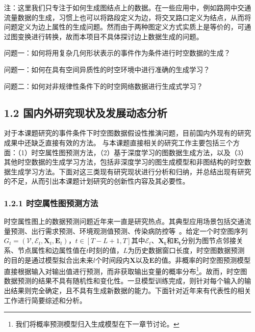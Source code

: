 \documentclass[12pt,UTF8,AutoFakeBold=2,a4paper]{ctexart} %
\begin{document}
注：这里我们只专注于如何生成图结点上的数据。在一些应用中，例如路网中交通流量数据的生成，习惯上也可以将路段定义为边，将交叉路口定义为结点，从而将问题定义为边上属性的生成问题。然而由于两种图定义方式实质上是等价的，可通过图变换进行转换，故而本项目不具体探讨边上数据生成的问题。



问题一：如何将用复杂几何形状表示的事件作为条件进行时空数据的生成？

问题一：如何在具有空间异质性的时空环境中进行准确的生成学习？

问题二：如何对非规律性条件下的时空网络数据进行生成式学习？

\fi

%
%

\subsection{1.2 国内外研究现状及发展动态分析}
对于本课题研究的事件条件下时空图数据假设性推演问题，目前国内外现有的研究成果中还缺乏直接有效的方法。 与本课题直接相关的研究工作主要包括三个方面：（1）时空属性图预测方法，（2）基于深度学习的图数据生成方法，以及（3）其他时空数据的生成学习方法，包括非深度学习的图生成模型和非图结构的时空数据生成学习方法。下面对这三类现有研究现状进行分析和归纳，并总结出现有研究的不足，从而引出本课题计划研究的创新性内容及其必要性。

\subsubsection{1.2.1 时空属性图预测方法}
时空属性图上的数据预测问题近年来一直是研究热点。其典型应用场景包括交通流量预测、出行需求预测、环境观测值预测、传染病防控等~\cite{jin2023spatio}。给定一个时空图序列$G_t=(\mathcal{V}, \mathcal{E}_t, \mathbf{X}_t, \mathbf{E}_t)$，$t\in [T-L+1, T]$其中$\mathcal{E}_t$、$\mathbf{X_t}$和$\mathbf{E_t}$分别为图节点邻接关系、节点属性和边属性值在$t$时刻的值，$L$为历史数据窗口长度，时空图数据预测的目的是通过模型拟合出未来$l$个时间段内$\mathbf{X}$以及$\mathbf{E}$的值。非概率的时空图预测模型直接根据输入对输出值进行预测，而非获取输出变量的概率分布\footnote{我们将概率预测模型归入生成模型在下一章节讨论。}。故而，时空图数据预测的结果不具有随机性和变化性。一旦模型训练完成，则针对每个输入的输出结果则完全确定，且不具有生成新数据的能力。下面针对近年来有代表性的相关工作进行简要综述和分析。
\end{document}
